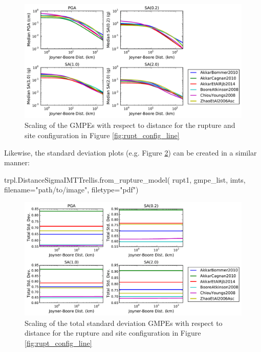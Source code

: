 \begin{figure}[htb]
	\centering
		\includegraphics[width=\textwidth]{./figures/trellis/distance_trellis_rupt.pdf}
	\caption{Scaling of the GMPEs with respect to distance for the rupture and site configuration in Figure \ref{fig:rupt_config_line}}
	\label{fig:distance_trellis_rupt}
\end{figure}

Likewise, the standard deviation plots (e.g. Figure \ref{fig:distance_sigma_trellis_rupt}) can be created in a similar manner:

\begin{python}
trpl.DistanceSigmaIMTTrellis.from_rupture_model(
    rupt1,
    gmpe_list,
    imts, 
    filename="path/to/image",
    filetype="pdf")
\end{python}

\begin{figure}[htb]
	\centering
		\includegraphics[width=\textwidth]{./figures/trellis/distance_sigma_trellis_rupt.pdf}
	\caption{Scaling of the total standard deviation  GMPEs with respect to distance for the rupture and site configuration in Figure \ref{fig:rupt_config_line}}
	\label{fig:distance_sigma_trellis_rupt}
\end{figure}


